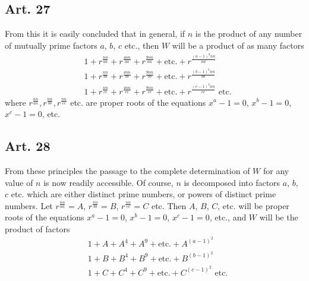 \documentclass{book}
\theoremstyle{plain}
\theoremstyle{remark}
\begin{document}
\subsection*{Art. 27} 

From this it is easily concluded that in general, if $n$ is the product of any number of mutually prime factors $a$, $b$, $c$ etc., then $W$ will be a product of as many factors 
\begin{align*}
& 1 + r^{\frac{nn}{aa}}+ r^{\frac{4nn}{aa}}+ r^{\frac{9nn}{aa}}+\textrm{etc.}+r^{\frac{(a-1)^2nn}{aa}} \\
& 1 + r^{\frac{nn}{bb}}+ r^{\frac{4nn}{bb}}+ r^{\frac{9nn}{bb}}+\textrm{etc.}+r^{\frac{(b-1)^2nn}{bb}} \\
& 1 + r^{\frac{nn}{cc}}+ r^{\frac{4nn}{cc}}+ r^{\frac{9nn}{cc}}+\textrm{etc.}+r^{\frac{(c-1)^2nn}{cc}} \textrm{ etc.} 
\end{align*}
where $ r^{\frac{nn}{aa}}, r^{\frac{nn}{bb}}, r^{\frac{nn}{cc}}$ etc. are proper roots of the equations $x^a-1=0$, $x^b-1=0$, $x^c-1=0$, etc.

\subsection*{Art. 28}

From these principles the passage to the complete determination of $W$ for any value of $n$ is now readily accessible.  Of course, $n$ is decomposed into factors $a$, $b$, $c$ etc. which are either distinct prime numbers, or powers of distinct prime numbers.   Let $r^{\frac{nn}{aa}} = A$, $r^{\frac{nn}{bb}} = B$, $r^{\frac{nn}{cc}} = C$ etc.  Then $A$, $B$, $C$, etc. will be proper roots of the equations $x^a-1=0$, $x^b-1=0$, $x^c-1=0$, etc., and $W$ will be the product of factors 
\begin{align*} 
&1 + A + A^4 + A^9 + \textrm{etc.} + A^{(a-1)^2} \\
&1 + B + B^4 + B^9 + \textrm{etc.} + B^{(b-1)^2} \\
&1 + C + C^4 + C^9 + \textrm{etc.} + C^{(c-1)^2} \textrm{ etc.} 
\end{align*}
\end{document}
